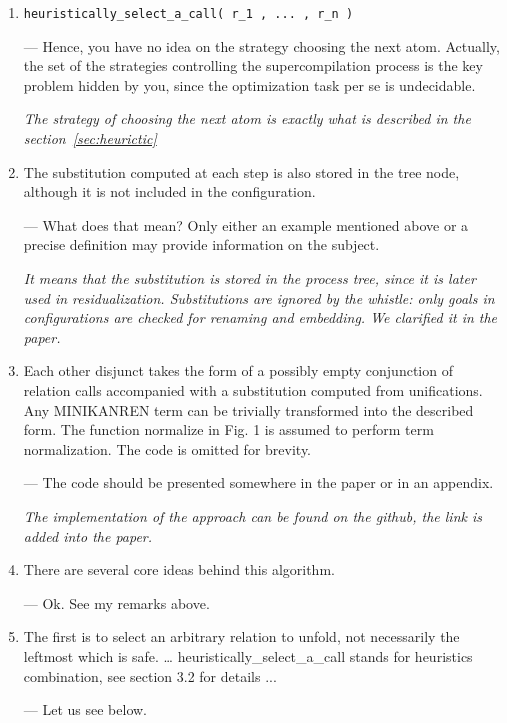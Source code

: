\begin{enumerate}
  \item{\verb!heuristically_select_a_call( r_1 , ... , r_n )!

  --- Hence, you have no idea on the strategy choosing the next atom. Actually, the set of the strategies controlling the supercompilation process is the key problem hidden by you, since the optimization task per se is undecidable.

  \emph{The strategy of choosing the next atom is exactly what is described in the section~\ref{sec:heurictic}}
  }

  \item{
    The substitution computed at each step is also stored in the tree node, although it is not included in the configuration.

    --- What does that mean? Only either an example mentioned above or a precise definition may provide information on the subject.

    \emph{It means that the substitution is stored in the process tree, since it is later used in residualization. Substitutions are ignored by the whistle: only goals in configurations are checked for renaming and embedding. We clarified it in the paper.}
  }

  \item{
    Each other disjunct takes the form of a possibly empty conjunction of relation calls accompanied with a substitution computed from unifications. Any MINIKANREN term can be trivially transformed into the described form. The function normalize in Fig. 1 is assumed to perform term normalization. The code is omitted for brevity.

    --- The code should be presented somewhere in the paper or in an appendix.

    \emph{The implementation of the approach can be found on the github, the link is added into the paper.}
  }

  \item{
    There are several core ideas behind this algorithm.

    --- Ok. See my remarks above.

  }

  \item{
    The first is to select an arbitrary relation to unfold, not necessarily the leftmost which is safe. … heuristically_select_a_call stands for heuristics combination, see section 3.2 for details ...

    --- Let us see below.

}
\end{enumerate}
